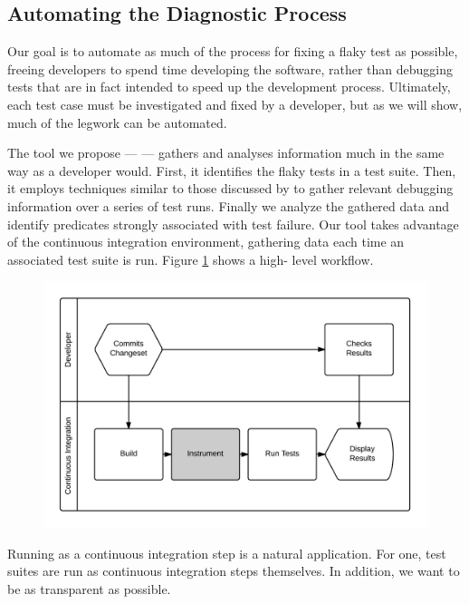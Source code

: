 \subsection{Automating the Diagnostic Process}

Our goal is to automate as much of the process for fixing a flaky test as
possible, freeing developers to spend time developing the software, rather than
debugging tests that are in fact intended to speed up the development process.
Ultimately, each test case must be investigated and fixed by a developer, but as
we will show, much of the legwork can be automated.

The tool we propose --- \textit{\splatter} --- gathers and analyses information
much in the same way as a developer would. First, it identifies the flaky tests
in a test suite. Then, it employs techniques similar to those discussed by
\citet{ArumugaNainar:2010:ABI:1806799.1806839} to gather relevant debugging
information over a series of test runs. Finally we analyze the gathered data and
identify predicates strongly associated with test failure. Our tool takes
advantage of the continuous integration environment, gathering data each time an
associated test suite is run. Figure \ref{fig:developer_workflow} shows a high-
level \splatter workflow.

\begin{figure}[h]

\includegraphics[width=\linewidth]{Images/developer_workflow}

\caption{}
\label{fig:developer_workflow}
\end{figure}

Running as a continuous integration step is a natural application. For one, test
suites are run as continuous integration steps themselves. In addition, we want
to be as transparent as possible.

